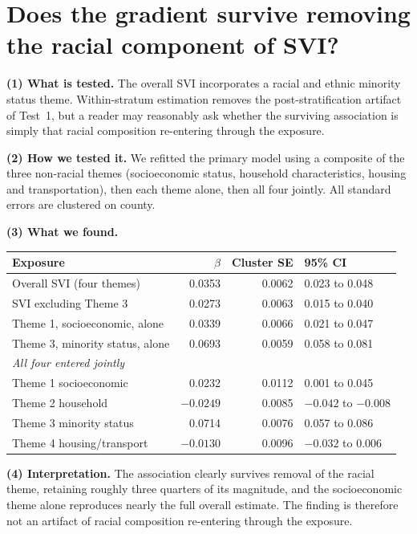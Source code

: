 \documentclass[11pt]{article}
\newcommand{\tpart}[1]{\medskip\noindent\textbf{#1}\quad}
\begin{document}
\section{Does the gradient survive removing the racial component of SVI?}

\tpart{(1) What is tested.} The overall SVI incorporates a racial and ethnic
minority status theme. Within-stratum estimation removes the post-stratification
artifact of Test~1, but a reader may reasonably ask whether the surviving
association is simply that racial composition re-entering through the exposure.

\tpart{(2) How we tested it.} We refitted the primary model using a composite of
the three non-racial themes (socioeconomic status, household characteristics,
housing and transportation), then each theme alone, then all four jointly. All
standard errors are clustered on county.

\tpart{(3) What we found.}
\begin{center}
\begin{tabular}{lrrl}
\toprule
Exposure & $\beta$ & Cluster SE & 95\% CI \\
\midrule
Overall SVI (four themes)         & 0.0353 & 0.0062 & 0.023 to 0.048 \\
SVI excluding Theme 3             & 0.0273 & 0.0063 & 0.015 to 0.040 \\
Theme 1, socioeconomic, alone     & 0.0339 & 0.0066 & 0.021 to 0.047 \\
Theme 3, minority status, alone   & 0.0693 & 0.0059 & 0.058 to 0.081 \\
\midrule
\multicolumn{4}{l}{\emph{All four entered jointly}}\\
\quad Theme 1 socioeconomic       & 0.0232 & 0.0112 & 0.001 to 0.045 \\
\quad Theme 2 household           & $-0.0249$ & 0.0085 & $-0.042$ to $-0.008$ \\
\quad Theme 3 minority status     & 0.0714 & 0.0076 & 0.057 to 0.086 \\
\quad Theme 4 housing/transport   & $-0.0130$ & 0.0096 & $-0.032$ to $0.006$ \\
\bottomrule
\end{tabular}
\end{center}

\tpart{(4) Interpretation.} The association clearly survives removal of the
racial theme, retaining roughly three quarters of its magnitude, and the
socioeconomic theme alone reproduces nearly the full overall estimate. The
finding is therefore not an artifact of racial composition re-entering through
the exposure.
\end{document}
